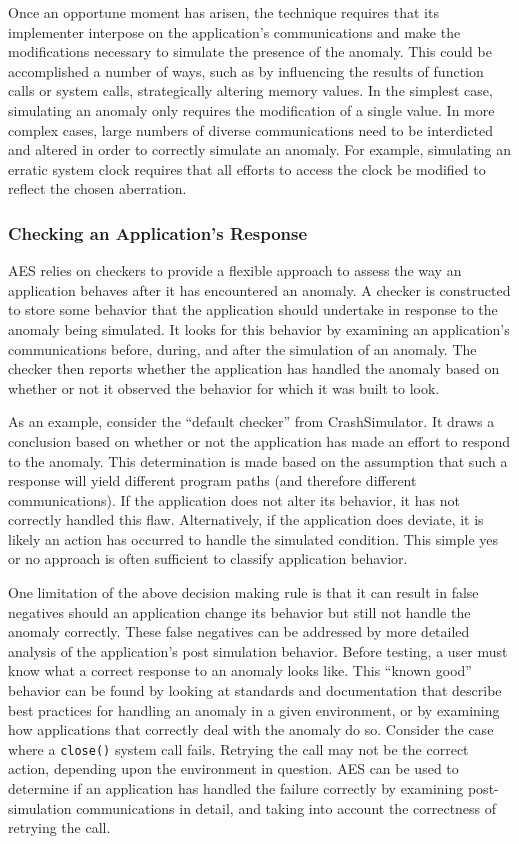 Once an opportune moment has arisen,
the technique requires that its implementer
interpose on the application's communications
and make the modifications necessary
to simulate the presence
of the anomaly.
This could be accomplished
a number of ways,
such as
by influencing the results of function calls or system calls,
strategically altering memory values.
In the simplest case,
simulating an anomaly only requires
the modification of a single value.
In more complex cases,
large numbers of diverse communications
need to be interdicted and altered
in order to correctly simulate an anomaly.
For example,
simulating an erratic system clock
requires that all efforts
to access the clock
be modified to reflect the chosen aberration.

\subsubsection{Checking an Application's Response}
\label{SUBSUB:CheckingResponse}
AES relies on checkers
to provide a flexible approach to assess the way an application
behaves after it has encountered an anomaly.
A checker is constructed to store
some behavior that the application should undertake
in response to the anomaly being simulated.
It looks for this behavior by examining an application's communications
before, during, and after the simulation of an anomaly.
The checker then reports whether the application has handled
the anomaly based on whether or not it observed the behavior for which it
was built to look.

As an example, consider the ``default checker'' from CrashSimulator.
It draws a conclusion based on
whether or not the application
has made an effort to respond
to the anomaly.
This determination is made based
on the assumption
that such a response will yield
different program paths (and therefore different communications).
If the application
does not alter its behavior, it has not
correctly handled this flaw.
Alternatively,
if the application does deviate,
it is likely
an action has occurred to handle the simulated condition.
This simple yes or no approach
is often sufficient
to classify application behavior.

One limitation of the above decision making rule
is that it can result in false negatives
should an application change its behavior
but still not handle the anomaly correctly.
These false negatives can be addressed
by more detailed analysis
of the application's post simulation behavior.
Before testing,
a user must know
what a correct response
to an anomaly looks like.
This ``known good'' behavior can be found
by looking at standards and documentation
that describe best practices for handling an anomaly
in a given environment,
or by examining how applications that correctly
deal with the anomaly do so.
Consider the case where a {\tt close()} system call fails.
Retrying the call may not be the correct action,
depending upon the environment in question.
AES can be used to determine if an application
has handled the failure correctly
by examining post-simulation communications in detail,
and taking into account the correctness of retrying the call.


